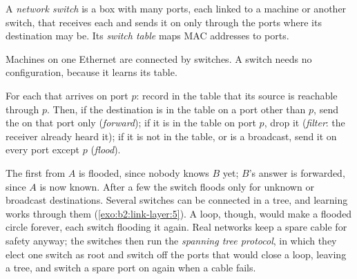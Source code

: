 \label{lst:b2:link-layer:frame}

\label{out:b2:link-layer:frame}

\begin{definition}\label{def:b2:link-layer:switch}
A \emph{network switch} is a box with many ports, each linked to a machine or another switch,
that receives each  and sends it on only through the ports where its destination may be. Its \emph{switch table}
maps MAC addresses to ports.
\end{definition}

Machines on one Ethernet are connected by switches. A switch needs no configuration, because it learns its table.

\begin{method}\label{met:b2:link-layer:switch}
For each  that arrives on port $p$: record in the table that its source is reachable through $p$. Then, if the
destination is in the table on a port other than $p$, send the  on that port only (\emph{forward}); if it is
in the table on port $p$, drop it (\emph{filter}: the receiver already heard it); if it is not in the table, or is a
broadcast, send it on every port except $p$ (\emph{flood}).
\end{method}



The first  from $A$ is flooded, since nobody knows $B$ yet; $B$'s answer is forwarded, since $A$ is now known.
After a few  the switch floods only for unknown or broadcast destinations. Several switches can be connected in
a tree, and learning works through them (\cref{exo:b2:link-layer:5}). A loop, though, would make a flooded 
circle forever, each switch flooding it again. Real networks keep a spare cable for safety anyway; the switches then
run the \emph{spanning tree protocol}, in which they elect one switch as root and switch off the ports that would
close a loop, leaving a tree, and switch a spare port on again when a cable fails.


